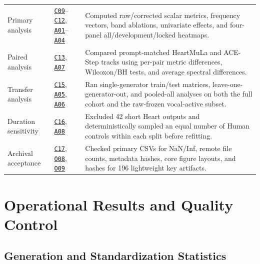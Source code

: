 \documentclass[11pt,a4paper]{article}
\newcommand{\coderef}[1]{\hyperlink{code:#1}{\texttt{#1}}}
\newcommand{\outref}[1]{\hyperlink{output:#1}{\texttt{#1}}}
\newcommand{\analysisref}[1]{\hyperlink{analysis:#1}{\texttt{#1}}}
\begin{document}
\begin{longtable}{p{22mm}p{36mm}p{86mm}}
Primary analysis & \coderef{C09}--\coderef{C12}, \analysisref{A01}--\analysisref{A04} & Computed raw/corrected scalar metrics, frequency vectors, band ablations, univariate effects, and four-panel all/development/locked heatmaps. \\
Paired analysis & \coderef{C13}, \analysisref{A07} & Compared prompt-matched HeartMuLa and ACE-Step tracks using per-pair metric differences, Wilcoxon/BH tests, and average spectral differences. \\
Transfer analysis & \coderef{C15}, \analysisref{A05}, \analysisref{A06} & Ran single-generator train/test matrices, leave-one-generator-out, and pooled-all analyses on both the full cohort and the raw-frozen vocal-active subset. \\
Duration sensitivity & \coderef{C16}, \analysisref{A08} & Excluded 42 short Heart outputs and deterministically sampled an equal number of Human controls within each split before refitting. \\
Archival acceptance & \coderef{C17}, \outref{O08}, \outref{O09} & Checked primary CSVs for NaN/Inf, remote file counts, metadata hashes, core figure layouts, and hashes for 196 lightweight key artifacts. \\
\bottomrule
\end{longtable}

\section{Operational Results and Quality Control}
\label{sec:qc}

\subsection{Generation and Standardization Statistics}
\end{document}
